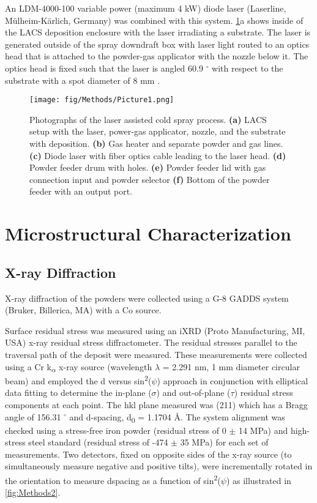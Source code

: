 	An LDM-4000-100 variable power (maximum 4 kW) diode laser (Laserline, Mülheim-Kärlich, Germany) was combined with this system. \ref{fig:Methods1}a shows inside of the LACS deposition enclosure with the laser irradiating a substrate. The laser is generated outside of the spray downdraft box with laser light routed to an optics head that is attached to the powder-gas applicator with the nozzle below it. The optics head is fixed such that the laser is angled 60.9 $ ^{\circ} $  with respect to the substrate with a spot diameter of 8 mm \cite{RN720}. 


	
	
	\begin{figure}
		\centering
		\texttt{[image: fig/Methods/Picture1.png]}
		\caption[Photographs of the laser assisted cold spray process.]{Photographs of the laser assisted cold spray process. \textbf{(a) }LACS setup with the laser, power-gas applicator, nozzle, and the substrate with deposition. \textbf{(b) }Gas heater and separate powder and gas lines. \textbf{(c) }Diode laser with fiber optics cable leading to the laser head. \textbf{(d) }Powder feeder drum with holes. \textbf{(e) }Powder feeder lid with gas connection input and powder selector \textbf{(f) }Bottom of the powder feeder with an output port.}
		\label{fig:Methods1}
	\end{figure}
	


\section*{Microstructural Characterization}

	\subsection*{X-ray Diffraction}	
		X-ray diffraction of the powders were collected using a G-8 GADDS system (Bruker, Billerica, MA) with a Co source. 
		
		Surface residual stress was measured using an iXRD (Proto Manufacturing, MI, USA) x-ray residual stress diffractometer. The residual stresses parallel to the traversal path of the deposit were measured. These measurements were collected using a Cr k\textsubscript{$ \alpha $ } x-ray source (wavelength $ \lambda $  = 2.291 nm, 1 mm diameter circular beam) and employed the d versus sin\textsuperscript{2}($\psi$) approach in conjunction with elliptical data fitting to determine the in-plane ($\sigma$) and out-of-plane ($\tau$) residual stress components at each point. The hkl plane measured was (211) which has a Bragg angle of 156.31 $ ^{\circ} $  and d-spacing, d\textsubscript{0} = 1.1704 Å. The system alignment was checked using a stress-free iron powder (residual stress of 0 $ \pm $  14 MPa) and high-stress steel standard (residual stress of -474 $ \pm $  35 MPa) for each set of measurements. Two detectors, fixed on opposite sides of the x-ray source (to simultaneously measure negative and positive  tilts), were incrementally rotated in the  orientation to measure dspacing as a function of sin\textsuperscript{2}($\psi
		$) as illustrated in \ref{fig:Methods2}. 
		
